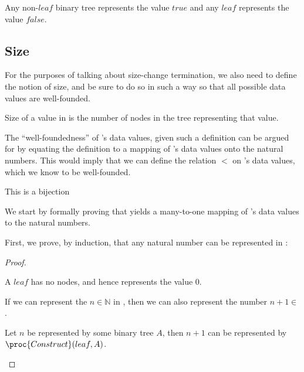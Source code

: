 \begin{definition}\label{definition:true-false}

Any non-$leaf$ binary tree represents the value $true$ and any $leaf$
represents the value $false$.

\end{definition}

\subsection{Size}

For the purposes of talking about size-change termination, we also need to
define the notion of size, and be sure to do so in such a way so that all
possible data values are well-founded.

\begin{definition}\label{definition:size}

Size of a value in  is the number of nodes in the tree representing
that value.

\end{definition}

The ``well-foundedness'' of 's data values, given such a definition can
be argued for by equating the definition to a mapping of 's data values
onto the natural numbers. This would imply that we can define the relation $<$
on 's data values, which we know to be well-founded. 

This is a bijection

We start by formally proving that  yields a many-to-one
mapping of 's data values to the natural numbers.

First, we prove, by induction, that any natural number can be represented in
:

\begin{proof}\ \\

\begin{description}[\setleftmargin{70pt}\setlabelstyle{\bf}]

\item [Base] A $leaf$ has no nodes, and hence represents the value $0$.

\item [Assumption] If we can represent the $n\in\mathbb{N}$ in , then
we can also represent the number $n+1\in$. 

\item [Induction] Let $n$ be represented by some binary tree $A$, then $n+1$
can be represented by $\proc{Construct}(leaf,A)$. 

\end{description}

\end{proof}

